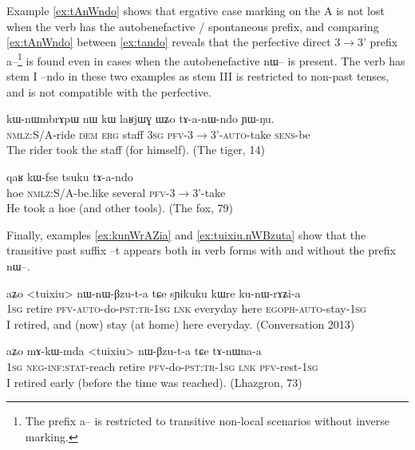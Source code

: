 \documentclass[oldfontcommands,oneside,a4paper,11pt]{article}
\newcommand{\ipa}[1]{{\phon \mbox{#1}}} %
\begin{document}
Example \ref{ex:tAnWndo} shows that ergative case marking on the A is not lost when the verb has the autobenefactive / spontaneous prefix, and comparing \ref{ex:tAnWndo} between  \ref{ex:tando} reveals that the perfective direct 3$\rightarrow$3' prefix \ipa{a--}\footnote{The  prefix \ipa{a--} is restricted to transitive non-local scenarios without inverse marking.  } is found even in cases when the autobenefactive \ipa{nɯ--} is present. The verb has stem I \ipa{--ndo} in these two examples as stem III is restricted to non-past tenses, and is not compatible with the perfective.

 \begin{exe}
\ex \label{ex:tAnWndo}
\gll
\ipa{kɯ-nɯmbrɤpɯ} 	\ipa{nɯ} 	\ipa{kɯ} 	\ipa{laʁjɯɣ} 	\ipa{ɯʑo} 	\ipa{tɤ-a-nɯ-ndo} 	\ipa{ɲɯ-ŋu.}\\
\textsc{nmlz}:S/A-ride \textsc{dem} \textsc{erg} staff \textsc{3sg} \textsc{pfv}-3$\rightarrow$3'-\textsc{auto}-take  \textsc{sens}-be\\ 
\glt The rider took the staff (for himself). (The tiger, 14) 
\end{exe}

 \begin{exe}
\ex \label{ex:tando}
\gll 
\ipa{qaʁ} 	\ipa{kɯ-fse} 	\ipa{tsuku} 	\ipa{tɤ-a-ndo}  \\
hoe  \textsc{nmlz}:S/A-be.like several \textsc{pfv}-3$\rightarrow$3'-take  \\ 
 \glt He took a hoe (and other tools). (The fox, 79)
\end{exe} 

Finally, examples \ref{ex:kunWrAZia} and \ref{ex:tuixiu.nWBzuta} show that the transitive past suffix \ipa{--t}   appears both in verb forms with and without the prefix \ipa{nɯ--}.

 \begin{exe}
\ex \label{ex:kunWrAZia}
\gll 
\ipa{aʑo} 	<tuixiu> 	\ipa{nɯ-nɯ-βzu-t-a} 	\ipa{tɕe} 	\ipa{sɲikuku} 	\ipa{kɯre} 	\ipa{ku-nɯ-rɤʑi-a} \\
\textsc{1sg} retire \textsc{pfv-auto}-do-\textsc{pst:tr-1sg} \textsc{lnk} everyday here \textsc{egoph-auto}-stay-\textsc{1sg} \\
\glt I retired, and (now) stay (at home) here everyday. (Conversation 2013)
\end{exe} 

 \begin{exe}
\ex \label{ex:tuixiu.nWBzuta}
\gll 
\ipa{aʑo} 	\ipa{mɤ-kɯ-mda} 	<tuixiu> 	\ipa{nɯ-βzu-t-a} \ipa{tɕe} 	\ipa{tɤ-nɯna-a} \\
\textsc{1sg} \textsc{neg-inf:stat}-reach retire \textsc{pfv}-do-\textsc{pst:tr-1sg} \textsc{lnk} \textsc{pfv}-rest-\textsc{1sg} \\
\glt I retired early (before the time was reached). (Lhazgron, 73)
\end{exe} 
\end{document}
